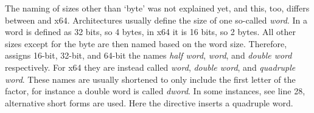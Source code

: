 The naming of sizes other than `byte' was not explained yet, and this, too, differs between \riscv{} and x64.
Architectures usually define the size of one so-called \emph{word}.
In \riscv{} a word is defined as 32 bits, so 4 bytes, in x64 it is 16 bits, so 2 bytes.
All other sizes except for the byte are then named based on the word size.
Therefore, \riscv{} assigns 16-bit, 32-bit, and 64-bit the names \emph{half word}, \emph{word}, and \emph{double word} respectively.
For x64 they are instead called \emph{word}, \emph{double word}, and \emph{quadruple word}.
These names are usually shortened to only include the first letter of the factor, for instance a double word is called \emph{dword}.
In some instances, see line 28, alternative short forms are used.
Here the directive  inserts a quadruple word.

